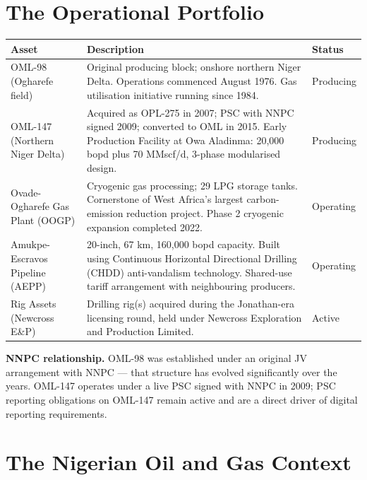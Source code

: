 \documentclass[10pt]{article}
\newcommand{\spacer}{\vspace{10pt}}
\newcommand{\bigspacer}{\vspace{16pt}}
\begin{document}
\bigspacer

\section{The Operational Portfolio}

\small
\begin{tabularx}{\columnwidth}{@{}lXl@{}}
\toprule
\textbf{Asset} & \textbf{Description} & \textbf{Status} \\
\midrule
OML-98 (Ogharefe field)
  & Original producing block; onshore northern Niger Delta. Operations
    commenced August 1976. Gas utilisation initiative running since 1984.
  & Producing \\
OML-147 (Northern Niger Delta)
  & Acquired as OPL-275 in 2007; PSC with NNPC signed 2009; converted to
    OML in 2015. Early Production Facility at Owa Aladinma:
    20{,}000 bopd plus 70 MMscf/d, 3-phase modularised design.
  & Producing \\
Ovade-Ogharefe Gas Plant (OOGP)
  & Cryogenic gas processing; 29 LPG storage tanks. Cornerstone of West
    Africa's largest carbon-emission reduction project. Phase 2 cryogenic
    expansion completed 2022.
  & Operating \\
Amukpe-Escravos Pipeline (AEPP)
  & 20-inch, 67 km, 160{,}000 bopd capacity. Built using Continuous
    Horizontal Directional Drilling (CHDD) anti-vandalism technology.
    Shared-use tariff arrangement with neighbouring producers.
  & Operating \\
Rig Assets (Newcross E\&P)
  & Drilling rig(s) acquired during the Jonathan-era licensing round, held
    under Newcross Exploration and Production Limited.
  & Active \\
\bottomrule
\end{tabularx}
\normalsize

\spacer
{\small\color{darkgrey}
\textbf{NNPC relationship.}\enspace
OML-98 was established under an original JV arrangement with NNPC --- that
structure has evolved significantly over the years. OML-147 operates under
a live PSC signed with NNPC in 2009; PSC reporting obligations on OML-147
remain active and are a direct driver of digital reporting requirements.
}

\bigspacer

\section{The Nigerian Oil and Gas Context}
\end{document}
